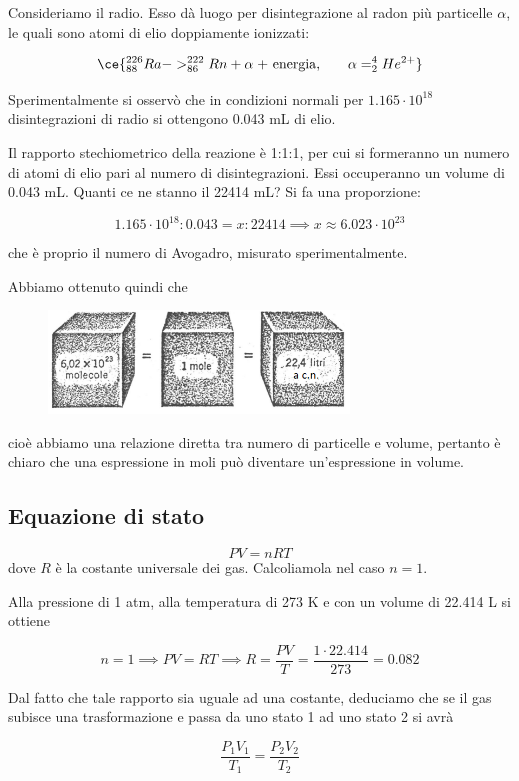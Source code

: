 Consideriamo il radio. Esso dà luogo per disintegrazione al radon più particelle $\alpha$, le quali sono atomi di elio doppiamente ionizzati:

$$\ce{^{226}_{88}Ra -> ^{222}_{86}Rn + \alpha \; \text{+ energia,} \qquad \alpha= ^{4}_{2}He^{2+}}$$

Sperimentalmente si osservò che in condizioni normali per $1.165 \cdot 10^{18}$ disintegrazioni di radio si ottengono 0.043 mL di elio.

Il rapporto stechiometrico della reazione è 1:1:1, per cui si formeranno un numero di atomi di elio pari al numero di disintegrazioni. Essi occuperanno un volume di 0.043 mL. Quanti ce ne stanno il 22414 mL? Si fa una proporzione:

$$1.165 \cdot 10^{18}:0.043=x:22414 \implies x \approx 6.023 \cdot 10^{23}$$

che è proprio il numero di Avogadro, misurato sperimentalmente.

Abbiamo ottenuto quindi che

\begin{figure}[htp]
    \centering
    \includegraphics[width=8cm]{immagini/legge_di_avogadro.png}
\end{figure}

cioè abbiamo una relazione diretta tra numero di particelle e volume, pertanto è chiaro che una espressione in moli può diventare un'espressione in volume.
\subsection{Equazione di stato}
$$PV=nRT$$
dove $R$ è la costante universale dei gas. Calcoliamola nel caso $n=1$.

Alla pressione di 1 atm, alla temperatura di 273 K e con un volume di 22.414 L si ottiene

$$n=1 \implies PV=RT \implies R=\frac{PV}{T}=\frac{1 \cdot 22.414}{273}=0.082$$

Dal fatto che tale rapporto sia uguale ad una costante, deduciamo che se il gas subisce una trasformazione e passa da uno stato 1 ad uno stato 2 si avrà

$$\frac{P_1V_1}{T_1}=\frac{P_2V_2}{T_2}$$

